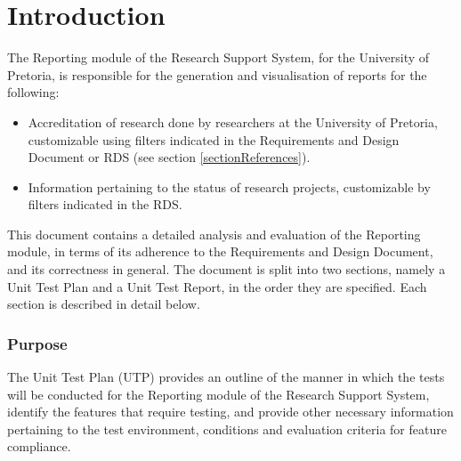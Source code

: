\section{Introduction}
The Reporting module of the Research Support System, for the University of Pretoria, is responsible for the generation and visualisation of reports for the following:
\begin{itemize}
	\item Accreditation of research done by researchers at the University of Pretoria, customizable using filters indicated in the Requirements and Design Document or RDS (see section \ref{sectionReferences}).
	\item Information pertaining to the status of research projects, customizable by filters indicated in the RDS.
\end{itemize}

This document contains a detailed analysis and evaluation of the Reporting module, in terms of its adherence to the Requirements and Design Document, and its correctness in general. 
The document is split into two sections, namely a Unit Test Plan and a Unit Test Report, in the order they are specified. Each section is described in detail below.



\subsubsection{Purpose}

The Unit Test Plan (UTP) provides an outline of the manner in which the tests will be conducted for the Reporting module of the Research Support System, identify the features that require testing, and provide other necessary information pertaining to the test environment, conditions and evaluation criteria for feature compliance.
 
